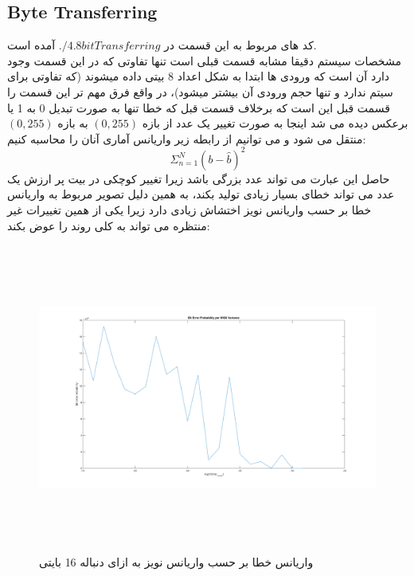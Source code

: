 \documentclass[a4paper,12pt]{article}
\begin{document}
\subsection{Byte Transferring}
کد های مربوط به این قسمت در $./4.8bitTransferring$ آمده است.
\\
مشخصات سیستم دقیقا مشابه قسمت قبلی است تنها تفاوتی که در این قسمت وجود دارد آن است که ورودی ها ابتدا به شکل اعداد 8 بیتی داده میشوند (که تفاوتی برای سیتم ندارد و تنها حجم ورودی آن بیشتر میشود)، در واقع فرق مهم تر این قسمت را قسمت قبل این است که برخلاف قسمت قبل که خطا تنها به صورت تبدیل 0 به 1 یا برعکس دیده می شد اینجا به صورت تغییر یک عدد از بازه $(0,255)$ به بازه $(0,255)$ منتقل می شود و می توانیم از رابطه زیر واریانس آماری آنان را محاسبه کنیم:
$$
\Sigma^{N}_{n=1} (b - \hat{b})^2
$$
حاصل این عبارت می تواند عدد بزرگی باشد زیرا تغییر کوچکی در بیت پر ارزش یک عدد می تواند خطای بسیار زیادی تولید بکند، به همین دلیل تصویر مربوط به واریانس خطا بر حسب واریانس نویز اختشاش زیادی دارد زیرا یکی از همین تغییرات غیر منتظره می تواند به کلی روند را عوض بکند:
\begin{figure}[htbp]
\centerline{\includegraphics[width=6.625in, height=4in]{../4.8bitTransferring/Q2_16Byte.png}}
\caption{واریانس خطا بر حسب واریانس نویز به ازای دنباله 16 بایتی}
\label{fig}
\end{figure}
\end{document}
